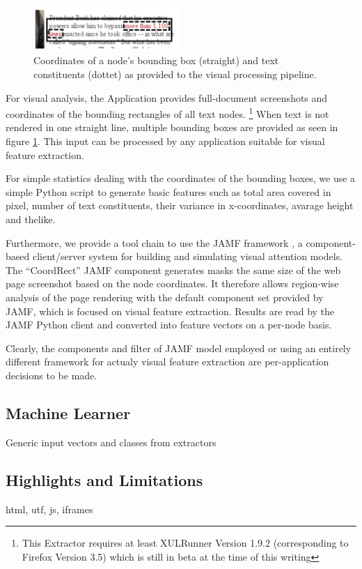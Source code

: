 \begin{figure}
\includegraphics[width=0.5\textwidth]{vizwrap}
\caption{\label{f:vizwrap}Coordinates of a node's bounding box (straight) and text constituents (dottet) as provided to the visual processing pipeline.}
\end{figure}

For visual analysis, the Application provides full-document screenshots and coordinates of the bounding rectangles of all text nodes.%
\footnote{This Extractor requires at least XULRunner Version 1.9.2 (corresponding to Firefox Version 3.5) which is still in beta at the time of this writing}
When text is not rendered in one straight line, multiple bounding boxes are provided as seen in figure \ref{f:vizwrap}.
This input can be processed by any application suitable for visual feature extraction.

For simple statistics dealing with the coordinates of the bounding boxes, we use a simple Python script to generate basic features such as total area covered in pixel, number of text constituents, their variance in x-coordinates, avarage height and thelike.

Furthermore, we provide a tool chain to use the JAMF framework \cite{Steger08}, a component-based client/server system for building and simulating visual attention models.
The ``CoordRect'' JAMF component generates masks the same size of the web page screenshot based on the node coordinates.
It therefore allows region-wise analysis of the page rendering with the default component set provided by JAMF, which is focused on visual feature extraction.
Results are read by the JAMF Python client and converted into feature vectors on a per-node basis.

Clearly, the components and filter of JAMF model employed or using an entirely different framework for actualy visual feature extraction are per-application decisions to be made.


\subsection{Machine Learner}

Generic input vectors and classes from extractors

\subsection{\label{sec:limitations}Highlights and Limitations}

html, utf, js, iframes
